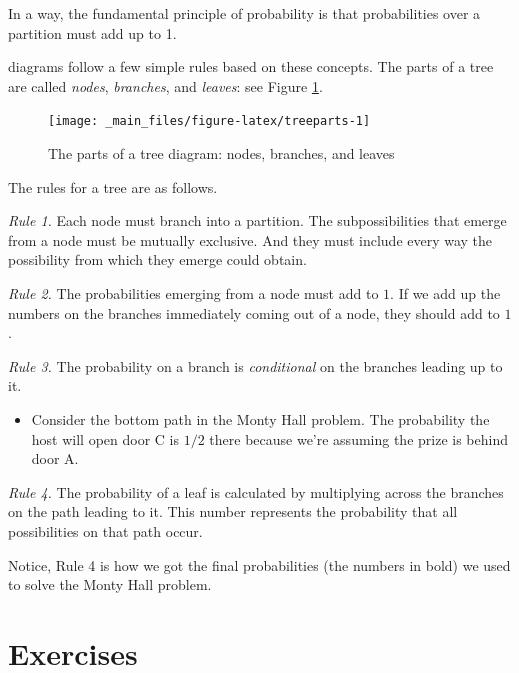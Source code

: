 \documentclass[justified]{tufte-book}
\providecommand{\tightlist}{%
  \setlength{\itemsep}{0pt}\setlength{\parskip}{0pt}}
\begin{document}
In a way, the fundamental principle of probability is that probabilities over a partition must add up to 1.

 diagrams follow a few simple rules based on these concepts. The parts of a tree are called \emph{nodes}, \emph{branches}, and \emph{leaves}: see Figure \ref{fig:treeparts}.

\begin{figure}
\texttt{[image: \_main\_files/figure-latex/treeparts-1]} \caption[The parts of a tree diagram]{The parts of a tree diagram: nodes, branches, and leaves}\label{fig:treeparts}
\end{figure}

The rules for a tree are as follows.

\emph{Rule 1.} Each node must branch into a partition. The subpossibilities that emerge from a node must be mutually exclusive. And they must include every way the possibility from which they emerge could obtain.

\emph{Rule 2.} The probabilities emerging from a node must add to \(1\). If we add up the numbers on the branches immediately coming out of a node, they should add to \(1\).

\emph{Rule 3.} The probability on a branch is \emph{conditional} on the branches leading up to it.

\begin{itemize}
\tightlist
\item
  Consider the bottom path in the Monty Hall problem. The probability the host will open door C is \(1/2\) there because we're assuming the prize is behind door A.
\end{itemize}

\emph{Rule 4.} The probability of a leaf is calculated by multiplying across the branches on the path leading to it. This number represents the probability that all possibilities on that path occur.

Notice, Rule 4 is how we got the final probabilities (the numbers in bold) we used to solve the Monty Hall problem.

\hypertarget{exercises}{%
\section*{Exercises}\label{exercises}}
\end{document}
